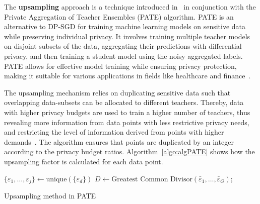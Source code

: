 The \textbf{upsampling} approach is a technique introduced in~\cite{ipate} in conjunction with the Private Aggregation of Teacher Ensembles (PATE) algorithm. PATE is an alternative to DP-SGD for training machine learning models on sensitive data while preserving individual privacy. It involves training multiple teacher models on disjoint subsets of the data, aggregating their predictions with differential privacy, and then training a student model using the noisy aggregated labels. PATE allows for effective model training while ensuring privacy protection, making it suitable for various applications in fields like healthcare and finance~\cite{pate}.

The upsampling mechanism relies on duplicating sensitive data
such that overlapping data-subsets can be allocated to different teachers. Thereby, data with higher privacy budgets are used to train a
higher number of teachers, thus revealing more information from data points with less restrictive privacy needs, and restricting the level of information derived from points with higher demands~\cite{ipate}. The algorithm ensures that points are duplicated by an integer according to the privacy budget ratios. Algorithm~\ref{algo:algPATE} shows how the upsampling factor is calculated for each data point.

\begin{algorithm}[H]
\SetAlgoLined
{}
{ $\{ \varepsilon_1, \ldots, \varepsilon_j \} \leftarrow \text{unique}(\{ \varepsilon_d \})$ } 
$D \leftarrow \text{Greatest Common Divisor}(\bar{\varepsilon}_1, \ldots, \bar{\varepsilon}_G )$; \\
\caption{Upsampling method in PATE~\cite{ipate}}
\label{algo:algPATE}
\end{algorithm}

